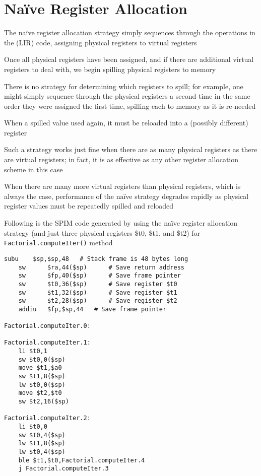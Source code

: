 \documentclass[8pt,a4paper,compress]{beamer}
\begin{document}
\section{Na\"{i}ve Register Allocation}
\begin{frame}[fragile]
\pause

The na\"{i}ve register allocation strategy simply sequences through the operations in the (LIR) code, assigning physical registers to virtual registers

\pause
\bigskip

Once all physical registers have been assigned, and if there are additional virtual registers to deal with, we begin spilling physical registers to memory

\pause
\bigskip

There is no strategy for determining which registers to spill; for example, one might simply sequence through the physical registers a second time in the same order they were assigned the first time, spilling each to memory as it is re-needed

\pause
\bigskip

When a spilled value used again, it must be reloaded into a (possibly different) register

\pause
\bigskip

Such a strategy works just fine when there are as many physical registers as there are virtual registers; in fact, it is as effective as any other register allocation scheme in this case

\pause
\bigskip

When there are many more virtual registers than physical registers, which is always the case, performance of the na\"{i}ve strategy degrades rapidly as physical register values must be repeatedly spilled and reloaded
\end{frame}

\begin{frame}[fragile]
\pause

Following is the SPIM code generated by \jmm using the na\"{i}ve register allocation strategy (and just three physical registers \$t0, \$t1, and \$t2) for \lstinline{Factorial.computeIter()} method

\begin{lstlisting}[language={},style=focusin]
    subu    $sp,$sp,48 	 # Stack frame is 48 bytes long
    sw      $ra,44($sp) 	 # Save return address
    sw      $fp,40($sp) 	 # Save frame pointer
    sw      $t0,36($sp) 	 # Save register $t0
    sw      $t1,32($sp) 	 # Save register $t1
    sw      $t2,28($sp) 	 # Save register $t2
    addiu   $fp,$sp,44 	 # Save frame pointer

Factorial.computeIter.0:

Factorial.computeIter.1:
    li $t0,1
    sw $t0,0($sp)
    move $t1,$a0
    sw $t1,8($sp)
    lw $t0,0($sp)
    move $t2,$t0
    sw $t2,16($sp)

Factorial.computeIter.2:
    li $t0,0
    sw $t0,4($sp)
    lw $t1,8($sp)
    lw $t0,4($sp)
    ble $t1,$t0,Factorial.computeIter.4
    j Factorial.computeIter.3

\end{lstlisting}
\end{frame}
\end{document}
